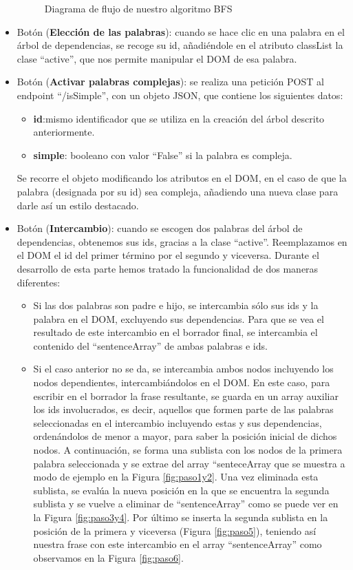\begin{itemize}
\begin{figure}[h!]
		
		\caption{Diagrama de flujo de nuestro algoritmo BFS}
		\label{fig:diagramaBFS}
	\end{figure}
	
		\item Botón (\textbf{Elección de las palabras}): cuando se hace clic en una palabra en el árbol de dependencias, se recoge su id, añadiéndole en el atributo classList la clase ``active'', que nos permite manipular el DOM de esa palabra. 
	\item Botón (\textbf{Activar palabras complejas}): se realiza una petición POST al endpoint ``/isSimple'', con un objeto JSON, que contiene los siguientes datos:
		\begin{itemize}
		\item \textbf{id}:mismo identificador que se utiliza en la creación del árbol descrito anteriormente.
		\item \textbf{simple}: booleano con valor ``False'' si la palabra es compleja.
	
	\end{itemize}
		
Se recorre el objeto modificando los atributos en el DOM, en el caso de que la palabra (designada por su id) sea compleja, añadiendo una nueva clase para darle así un estilo destacado.
	
	\item Botón (\textbf{Intercambio}): cuando se escogen dos palabras del árbol de dependencias, obtenemos sus ids, gracias a la clase ``active''. Reemplazamos en el DOM el id del primer término por el segundo y viceversa.
	Durante el desarrollo de esta parte hemos tratado la funcionalidad de dos maneras diferentes:
	\begin{itemize}
		\item Si las dos palabras son padre e hijo, se intercambia sólo sus ids y la palabra en el DOM, excluyendo sus dependencias.
		Para que se vea el resultado de este intercambio en el borrador final, se intercambia el contenido del ``sentenceArray'' de ambas palabras e ids.  
		\item Si el caso anterior no se da, se intercambia ambos nodos incluyendo los nodos dependientes, intercambiándolos en el DOM. En este caso, para escribir en el borrador la frase resultante, se guarda en un array auxiliar los ids involucrados, es decir, aquellos que formen parte de las palabras seleccionadas en el intercambio incluyendo estas y sus dependencias, ordenándolos de menor a mayor, para saber la posición inicial de dichos nodos. A continuación, se forma una sublista con los nodos de la primera palabra seleccionada y se extrae del array ``senteceArray que se muestra a modo de ejemplo en la Figura \ref{fig:paso1y2}. Una vez eliminada esta sublista, se evalúa la nueva posición en la que se encuentra la segunda sublista y se vuelve a eliminar de ``sentenceArray'' como se puede ver en la Figura \ref{fig:paso3y4}. Por último se inserta la segunda sublista en la posición de la primera y viceversa (Figura \ref{fig:paso5}), teniendo así nuestra frase con este intercambio en el array ``sentenceArray'' como observamos en la Figura \ref{fig:paso6}.
			\begin{figure}[h!]
			\centering
			

\end{figure}
\end{itemize}
\end{itemize}
